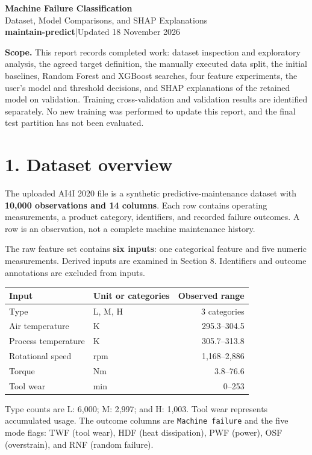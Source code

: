 \documentclass[11pt,a4paper]{article}
\newcommand{\pagetitle}[1]{\section*{#1}}
\begin{document}
\begin{center}
{\Large\bfseries\color{reportblue} Machine Failure Classification}\\[5pt]
{\large Dataset, Model Comparisons, and SHAP Explanations}\\[6pt]
\textbf{maintain-predict}\quad |\quad Updated 18 November 2026
\end{center}

\textbf{Scope.} This report records completed work: dataset inspection and
exploratory analysis, the agreed target definition, the manually executed data
split, the initial baselines, Random Forest and XGBoost searches, four
feature experiments, the user's model and threshold decisions, and SHAP
explanations of the retained model on validation.
Training cross-validation and validation results are identified separately.
No new training was performed to update this report, and the final test
partition has not been evaluated.

\pagetitle{1. Dataset overview}
The uploaded AI4I 2020 file is a synthetic predictive-maintenance dataset with
\textbf{10,000 observations and 14 columns}. Each row contains operating
measurements, a product category, identifiers, and recorded failure outcomes.
A row is an observation, not a complete machine maintenance history.

The raw feature set contains \textbf{six inputs}: one categorical feature
and five numeric measurements. Derived inputs are examined in Section 8. Identifiers and outcome annotations are excluded from inputs.

\begin{center}
\begin{tabular}{llr}
\toprule
Input & Unit or categories & Observed range \\
\midrule
Type & L, M, H & 3 categories \\
Air temperature & K & 295.3--304.5 \\
Process temperature & K & 305.7--313.8 \\
Rotational speed & rpm & 1,168--2,886 \\
Torque & Nm & 3.8--76.6 \\
Tool wear & min & 0--253 \\
\bottomrule
\end{tabular}
\end{center}

Type counts are L: 6,000; M: 2,997; and H: 1,003. Tool wear represents
accumulated usage. The outcome columns are \texttt{Machine failure} and the
five mode flags: TWF (tool wear), HDF (heat dissipation), PWF (power), OSF
(overstrain), and RNF (random failure).
\end{document}
